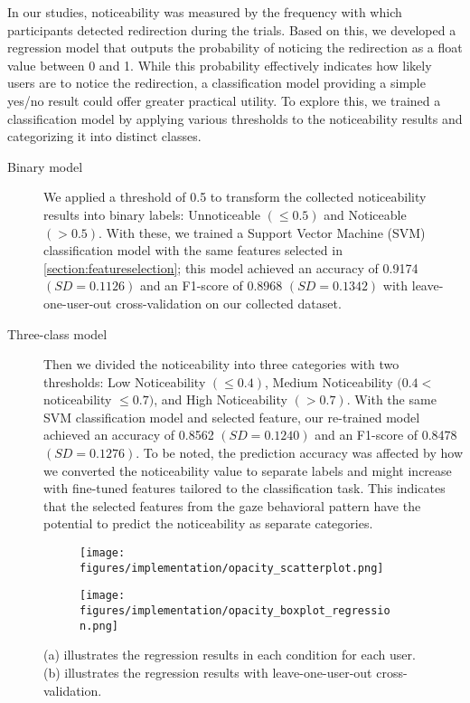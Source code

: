 In our studies, noticeability was measured by the frequency with which participants detected redirection during the trials. Based on this, we developed a regression model that outputs the probability of noticing the redirection as a float value between 0 and 1. While this probability effectively indicates how likely users are to notice the redirection, a classification model providing a simple yes/no result could offer greater practical utility.
To explore this, we trained a classification model by applying various thresholds to the noticeability results and categorizing it into distinct classes. 

\begin{description}
\item[Binary model]
We applied a threshold of 0.5 to transform the collected noticeability results into binary labels: Unnoticeable $(\leq 0.5)$ and Noticeable $(> 0.5)$.
With these, we trained a Support Vector Machine (SVM) classification model with the same features selected in \autoref{section:featureselection}; this model achieved an accuracy of 0.9174 $(SD=0.1126)$ and an F1-score of 0.8968 $(SD=0.1342)$ with leave-one-user-out cross-validation on our collected dataset.
\item[Three-class model]
Then we divided the noticeability into three categories with two thresholds: Low Noticeability $(\leq 0.4)$, Medium Noticeability $(0.4 <$ noticeability $\leq 0.7)$, and High Noticeability $(>0.7)$.
With the same SVM classification model and selected feature, our re-trained model achieved an accuracy of 0.8562 $(SD=0.1240)$ and an F1-score of 0.8478 $(SD=0.1276)$.
To be noted, the prediction accuracy was affected by how we converted the noticeability value to separate labels and might increase with fine-tuned features tailored to the classification task.
This indicates that the selected features from the gaze behavioral pattern have the potential to predict the noticeability as separate categories.
\end{description}

\begin{figure*}[t]
    \centering
    \begin{subfigure}{0.47\linewidth}
        \texttt{[image: figures/implementation/opacity\_scatterplot.png]}
        \caption{}
        \label{figure:predictionperformance_peruser}
    \end{subfigure}
    \centering
    \begin{subfigure}{0.47\linewidth}
        \texttt{[image: figures/implementation/opacity\_boxplot\_regression.png]}
        \caption{}
        \label{figure:predictionperformance_average}
    \end{subfigure}
    \caption{(a) illustrates the regression results in each condition for each user. (b) illustrates the regression results with leave-one-user-out cross-validation.}
    \label{figure:predictionperformance}
\end{figure*}


